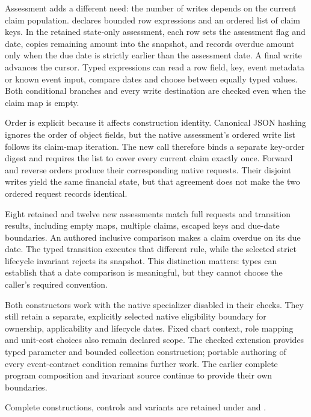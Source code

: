 Assessment adds a different need: the number of writes depends on the current
claim population.  declares bounded row
expressions and an ordered list of claim keys. In the retained state-only
assessment, each row sets the assessment flag and date, copies remaining
amount into the snapshot, and records overdue amount only when the due date
is strictly earlier than the assessment date. A final write advances the
cursor. Typed expressions can read a row field, key, event metadata or known
event input, compare dates and choose between equally typed values. Both
conditional branches and every write destination are checked even when the
claim map is empty.

Order is explicit because it affects construction identity. Canonical JSON
hashing ignores the order of object fields, but the native assessment's ordered
write list follows its claim-map iteration. The new call therefore binds a
separate key-order digest and requires the list to cover every current claim
exactly once. Forward and reverse orders produce their corresponding native
requests. Their disjoint writes yield the same financial state, but that
agreement does not make the two ordered request records identical.

Eight retained and twelve new assessments match full requests and transition
results, including empty maps, multiple claims, escaped keys and due-date
boundaries. An authored inclusive comparison makes a claim overdue on its due
date. The typed transition executes that different rule, while the selected
strict lifecycle invariant rejects its snapshot. This distinction matters:
types can establish that a date comparison is meaningful, but they cannot
choose the caller's required convention.

Both constructors work with the native specializer disabled in their checks.
They still retain a separate, explicitly selected native eligibility boundary
for ownership, applicability and lifecycle dates. Fixed chart context, role
mapping and unit-cost choices also remain declared scope. The checked extension
provides typed parameter and bounded collection construction; portable authoring
of every event-contract condition remains further work. The earlier complete
program composition and invariant source continue to provide their own
boundaries.

\begingroup\raggedright
Complete constructions, controls and variants are retained under
and .
\par
\endgroup
